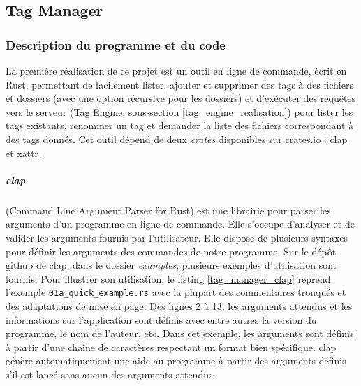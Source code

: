 

\subsection{Tag Manager}\label{tag_manager}
\subsubsection{Description du programme et du code}\label{tag_manager_description}
La première réalisation de ce projet est un outil en ligne de commande, écrit en Rust, permettant 
de facilement lister, ajouter et supprimer des tags à des fichiers et dossiers (avec une option 
récursive pour les dossiers) et d'exécuter des requêtes vers le serveur (Tag Engine, sous-section 
\ref{tag_engine_realisation}) pour lister 
les tags existants, renommer un tag et demander la liste des fichiers correspondant à des tags 
donnés. Cet outil dépend de deux \textit{crates} disponibles sur \href{https://crates.io}{crates.io} 
: clap \cite{ref22} et xattr \cite{ref23}.
\subparagraph{clap}
(Command Line Argument Parser for Rust) est une 
librairie pour parser les arguments d'un programme en ligne de commande. Elle s'occupe d'analyser 
et de valider les arguments fournis par l'utilisateur. Elle dispose de plusieurs syntaxes pour 
définir les arguments des commandes de notre programme. Sur le dépôt github de clap, dans le 
dossier \textit{examples}, plusieurs exemples d'utilisation sont fournis. Pour illustrer son 
utilisation, le listing \ref{tag_manager_clap} reprend l'exemple \texttt{01a_quick_example.rs} 
avec la plupart des commentaires tronqués et des adaptations de mise en page. Des lignes 2 à 13, 
les arguments attendus et les informations sur l'application sont définis avec entre autres la 
version du programme, le nom de l'auteur, etc. Dans cet exemple, les arguments sont définis à 
partir d'une chaîne de caractères respectant un format bien spécifique. clap génère automatiquement 
une aide au programme à partir des arguments définis s'il est lancé sans aucun des arguments attendus.

